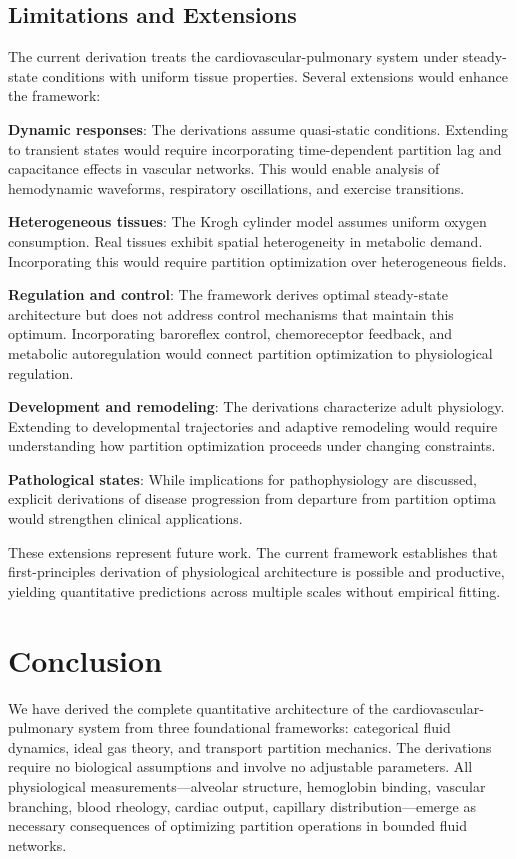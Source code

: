 \documentclass[10pt,twocolumn,a4paper]{article}
\theoremstyle{remark}
\begin{document}
\subsection{Limitations and Extensions}

The current derivation treats the cardiovascular-pulmonary system under steady-state conditions with uniform tissue properties. Several extensions would enhance the framework:

\textbf{Dynamic responses}: The derivations assume quasi-static conditions. Extending to transient states would require incorporating time-dependent partition lag and capacitance effects in vascular networks. This would enable analysis of hemodynamic waveforms, respiratory oscillations, and exercise transitions.

\textbf{Heterogeneous tissues}: The Krogh cylinder model assumes uniform oxygen consumption. Real tissues exhibit spatial heterogeneity in metabolic demand. Incorporating this would require partition optimization over heterogeneous fields.

\textbf{Regulation and control}: The framework derives optimal steady-state architecture but does not address control mechanisms that maintain this optimum. Incorporating baroreflex control, chemoreceptor feedback, and metabolic autoregulation would connect partition optimization to physiological regulation.

\textbf{Development and remodeling}: The derivations characterize adult physiology. Extending to developmental trajectories and adaptive remodeling would require understanding how partition optimization proceeds under changing constraints.

\textbf{Pathological states}: While implications for pathophysiology are discussed, explicit derivations of disease progression from departure from partition optima would strengthen clinical applications.

These extensions represent future work. The current framework establishes that first-principles derivation of physiological architecture is possible and productive, yielding quantitative predictions across multiple scales without empirical fitting.

\section{Conclusion}

We have derived the complete quantitative architecture of the cardiovascular-pulmonary system from three foundational frameworks: categorical fluid dynamics, ideal gas theory, and transport partition mechanics. The derivations require no biological assumptions and involve no adjustable parameters. All physiological measurements—alveolar structure, hemoglobin binding, vascular branching, blood rheology, cardiac output, capillary distribution—emerge as necessary consequences of optimizing partition operations in bounded fluid networks.
\end{document}
